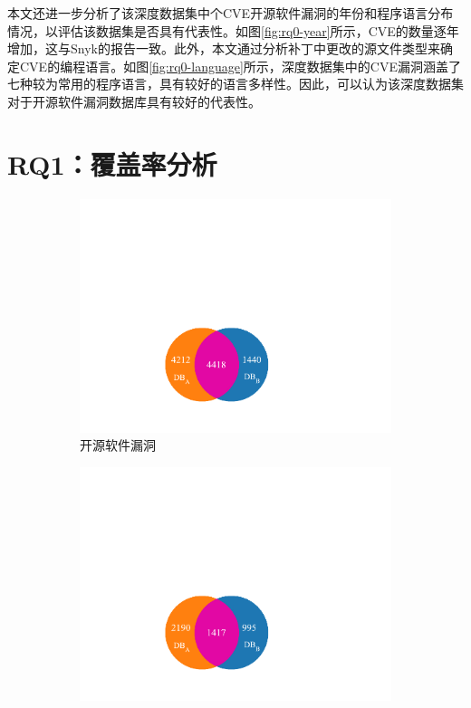 本文还进一步分析了该深度数据集中个CVE开源软件漏洞的年份和程序语言分布情况，以评估该数据集是否具有代表性。如图\ref{fig:rq0-year}所示，CVE的数量逐年增加，这与Snyk的报告\cite{Snyk-report}一致。此外，本文通过分析补丁中更改的源文件类型来确定CVE的编程语言。如图\ref{fig:rq0-language}所示，深度数据集中的CVE漏洞涵盖了七种较为常用的程序语言，具有较好的语言多样性。因此，可以认为该深度数据集对于开源软件漏洞数据库具有较好的代表性。


\section{RQ1：覆盖率分析}\label{sec:coverage}
\begin{figure}[h]
    \centering
    \begin{subfigure}[b]{0.45\textwidth}
    \centering
    \includegraphics[scale=0.98]{res/rq1-CVE-IDs-VS.pdf}
    \caption{开源软件漏洞}\label{fig:rq1-cves}
    \end{subfigure}
    \begin{subfigure}[b]{0.45\textwidth}
    \centering
    \includegraphics[scale=0.98]{res/rq1-CVE-IDs-Patches-VS.pdf}

\end{subfigure}
\end{figure}
